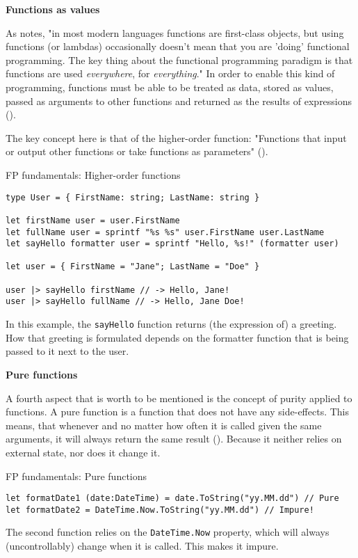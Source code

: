 \textbf{Functions as values}

As \cite[151]{wlaschin_domain_2018} notes, "in most modern languages functions are first-class objects, but using functions (or lambdas) occasionally doesn't mean that you are 'doing' functional programming. The key thing about the functional programming paradigm is that functions are used \emph{everywhere}, for \emph{everything}." In order to enable this kind of programming, functions must be able to be treated as data, stored as values, passed as arguments to other functions and returned as the results of expressions (\cite[35]{harrop_f_2008}).

The key concept here is that of the higher-order function: "Functions that input or output other functions or take functions as parameters" (\cite[153]{wlaschin_domain_2018}).

\begin{listing}[H]
\caption{FP fundamentals: Higher-order functions}
\label{listing:fp_hof}
\begin{verbatim}
type User = { FirstName: string; LastName: string }

let firstName user = user.FirstName
let fullName user = sprintf "%s %s" user.FirstName user.LastName
let sayHello formatter user = sprintf "Hello, %s!" (formatter user)

let user = { FirstName = "Jane"; LastName = "Doe" }

user |> sayHello firstName // -> Hello, Jane!
user |> sayHello fullName // -> Hello, Jane Doe!
\end{verbatim}
\end{listing}

In this example, the \texttt{sayHello} function returns (the expression of) a greeting. How that greeting is formulated depends on the formatter function that is being passed to it next to the user. 

\textbf{Pure functions}

A fourth aspect that is worth to be mentioned is the concept of purity applied to functions. A pure function is a function that does not have any side-effects. This means, that whenever and no matter how often it is called given the same arguments, it will always return the same result (\cite{meijer_erik_2008}). Because it neither relies on external state, nor does it change it.

\begin{listing}[H]
\caption{FP fundamentals: Pure functions}
\label{listing:fp_hof}
\begin{verbatim}
let formatDate1 (date:DateTime) = date.ToString("yy.MM.dd") // Pure
let formatDate2 = DateTime.Now.ToString("yy.MM.dd") // Impure!
\end{verbatim}
\end{listing}

The second function relies on the \texttt{DateTime.Now} property, which will always (uncontrollably) change when it is called. This makes it impure.
